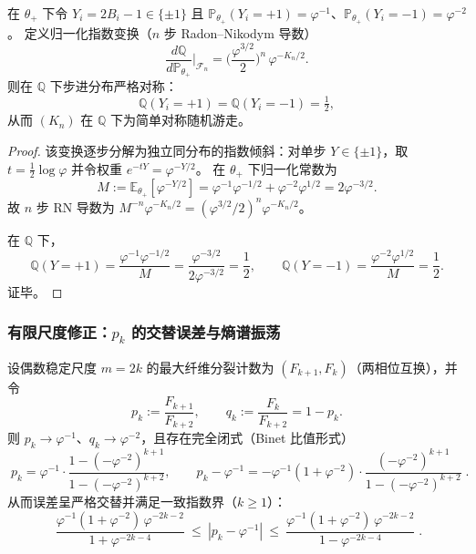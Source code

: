 \begin{proposition}\label{prop:pom-golden-esscher-symmetrization}
在 \(\theta_+\) 下令 \(Y_i=2B_i-1\in\{\pm 1\}\) 且 \(\mathbb{P}_{\theta_+}(Y_i=+1)=\varphi^{-1}\)、\(\mathbb{P}_{\theta_+}(Y_i=-1)=\varphi^{-2}\)。
定义归一化指数变换（\(n\) 步 Radon--Nikodym 导数）
\[
\boxed{\;
\frac{d\mathbb{Q}}{d\mathbb{P}_{\theta_+}}\Big|_{\mathcal{F}_n}
=\Big(\frac{\varphi^{3/2}}{2}\Big)^{n}\,\varphi^{-K_n/2}.\;}
\]
则在 \(\mathbb{Q}\) 下步进分布严格对称：
\[
\boxed{\;\mathbb{Q}(Y_i=+1)=\mathbb{Q}(Y_i=-1)=\tfrac12,\;}
\]
从而 \((K_n)\) 在 \(\mathbb{Q}\) 下为简单对称随机游走。
\end{proposition}

\begin{proof}
该变换逐步分解为独立同分布的指数倾斜：对单步 \(Y\in\{\pm 1\}\)，取
\(
t=\tfrac12\log\varphi
\)
并令权重 \(e^{-tY}=\varphi^{-Y/2}\)。
在 \(\theta_+\) 下归一化常数为
\[
M:=\mathbb{E}_{\theta_+}[\varphi^{-Y/2}]
=\varphi^{-1}\varphi^{-1/2}+\varphi^{-2}\varphi^{1/2}
=2\varphi^{-3/2}.
\]
故 \(n\) 步 RN 导数为 \(M^{-n}\varphi^{-K_n/2}=(\varphi^{3/2}/2)^n\varphi^{-K_n/2}\)。
\par
在 \(\mathbb{Q}\) 下，
\[
\mathbb{Q}(Y=+1)=\frac{\varphi^{-1}\varphi^{-1/2}}{M}
=\frac{\varphi^{-3/2}}{2\varphi^{-3/2}}=\frac12,
\qquad
\mathbb{Q}(Y=-1)=\frac{\varphi^{-2}\varphi^{1/2}}{M}=\frac12.
\]
证毕。
\end{proof}

\subsubsection{有限尺度修正：\texorpdfstring{$p_k$}{p\_k} 的交替误差与熵谱振荡}

\begin{proposition}\label{prop:pom-max-fiber-split-ratio-finite-scale}
设偶数稳定尺度 \(m=2k\) 的最大纤维分裂计数为 \((F_{k+1},F_k)\)（两相位互换），并令
\[
p_k:=\frac{F_{k+1}}{F_{k+2}},\qquad q_k:=\frac{F_k}{F_{k+2}}=1-p_k.
\]
则 \(p_k\to\varphi^{-1}\)、\(q_k\to\varphi^{-2}\)，且存在完全闭式（Binet 比值形式）
\[
\boxed{\;
p_k=\varphi^{-1}\cdot\frac{1-(-\varphi^{-2})^{k+1}}{1-(-\varphi^{-2})^{k+2}},\qquad
p_k-\varphi^{-1}
=-\varphi^{-1}(1+\varphi^{-2})\cdot
\frac{(-\varphi^{-2})^{k+1}}{1-(-\varphi^{-2})^{k+2}}\; }.
\]
从而误差呈严格交替并满足一致指数界（\(k\ge 1\)）：
\[
\boxed{\;
\frac{\varphi^{-1}(1+\varphi^{-2})\,\varphi^{-2k-2}}{1+\varphi^{-2k-4}}
\ \le\
|p_k-\varphi^{-1}|
\ \le\
\frac{\varphi^{-1}(1+\varphi^{-2})\,\varphi^{-2k-2}}{1-\varphi^{-2k-4}}\; }.
\]
\end{proposition}

